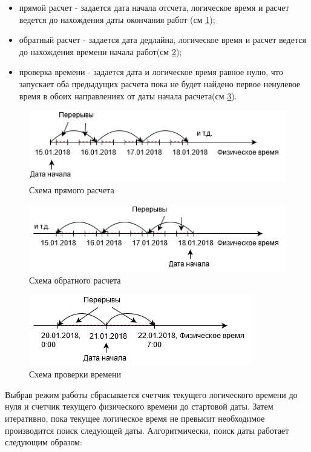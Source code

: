 \begin{itemize}
	\item прямой расчет - задается дата начала отсчета, логическое время и расчет ведется до нахождения даты окончания работ (см \ref{fig:straightCalc});
	\item обратный расчет - задается дата дедлайна, логическое время и расчет ведется до нахождения времени начала работ(см \ref{fig:reverceCalc});
	\item проверка времени - задается дата и логическое время равное нулю, что запускает оба предыдущих расчета пока не будет найдено первое ненулевое время в обоих направлениях от даты начала расчета(см \ref{fig:checkCalc}).
\end{itemize}

\begin{figure}[ht!]
	\centering
	\includegraphics[width=0.7\linewidth]{pics/scheduleStraightCalc.png}
	\caption{Схема прямого расчета}
	\label{fig:straightCalc}
\end{figure}

\begin{figure}[ht!]
	\centering
	\includegraphics[width=0.7\linewidth]{pics/scheduleReverceCalc.png}
	\caption{Схема обратного расчета}
	\label{fig:reverceCalc}
\end{figure}

\begin{figure}[ht!]
	\centering
	\includegraphics[width=0.7\linewidth]{pics/scheduleCheckCalc.png}
	\caption{Схема проверки времени}
	\label{fig:checkCalc}
\end{figure}

\indent Выбрав режим работы сбрасывается счетчик текущего логического времени до нуля и счетчик текущего физического времени до стартовой даты. Затем итеративно, пока текущее логическое время не превысит необходимое производится поиск следующей даты.
Алгоритмически, поиск даты работает следующим образом:

